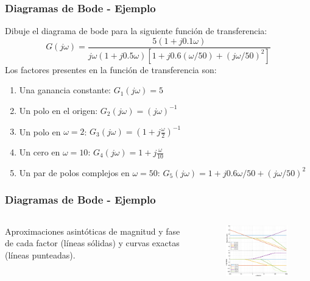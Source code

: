 \documentclass[aspectratio=169, handout]{beamer}
\theoremstyle{definition}
\theoremstyle{plain}
\theoremstyle{remark}
\begin{document}
\begin{frame}[<+->]\frametitle{Diagramas de Bode - Ejemplo}
	Dibuje el diagrama de bode para la siguiente función de transferencia:
	\begin{equation*}
		G(j\omega) = \frac{5(1+j0.1\omega)}{j\omega(1+j0.5\omega)[1+j0.6(\omega/50)+(j\omega/50)^2]}
	\end{equation*}
	\pause
	Los factores presentes en la función de transferencia son:
	\begin{enumerate}
		\item Una ganancia constante: $G_1(j\omega) = 5$
		\item Un polo en el origen: $G_2(j\omega) = (j\omega)^{-1}$
		\item Un polo en $\omega = 2$: $G_3(j\omega) = \left(1+j\frac{\omega}{2}\right)^{-1}$
		\item Un cero en $\omega = 10$: $G_4(j\omega) = 1+j\frac{\omega}{10}$
		\item Un par de polos complejos en $\omega = 50$: $G_5(j\omega) = 1+j0.6\omega/50+(j\omega/50)^2$
	\end{enumerate}
\end{frame}

\begin{frame}[<+->]\frametitle{Diagramas de Bode - Ejemplo}
	\vspace*{-2mm}
	\begin{columns}
		\begin{column}{0.3\textwidth}
			Aproximaciones asintóticas de magnitud y fase de cada factor (líneas sólidas) y curvas exactas (líneas punteadas).
		\end{column}
		\begin{column}{0.7\textwidth}
	\begin{figure}
		\centering
		\includegraphics[width=9cm]{images/bodeExample1a.eps}
	\end{figure}
		\end{column}
	\end{columns}
\end{frame}
\end{document}
